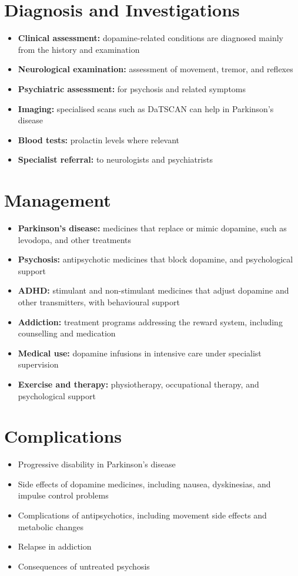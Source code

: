 \section*{Diagnosis and Investigations}
\begin{itemize}
    \item \textbf{Clinical assessment:} dopamine-related conditions are diagnosed mainly from the history and examination
    \item \textbf{Neurological examination:} assessment of movement, tremor, and reflexes
    \item \textbf{Psychiatric assessment:} for psychosis and related symptoms
    \item \textbf{Imaging:} specialised scans such as DaTSCAN can help in Parkinson's disease
    \item \textbf{Blood tests:} prolactin levels where relevant
    \item \textbf{Specialist referral:} to neurologists and psychiatrists
\end{itemize}

\section*{Management}
\begin{itemize}
    \item \textbf{Parkinson's disease:} medicines that replace or mimic dopamine, such as levodopa, and other treatments
    \item \textbf{Psychosis:} antipsychotic medicines that block dopamine, and psychological support
    \item \textbf{ADHD:} stimulant and non-stimulant medicines that adjust dopamine and other transmitters, with behavioural support
    \item \textbf{Addiction:} treatment programs addressing the reward system, including counselling and medication
    \item \textbf{Medical use:} dopamine infusions in intensive care under specialist supervision
    \item \textbf{Exercise and therapy:} physiotherapy, occupational therapy, and psychological support
\end{itemize}

\section*{Complications}
\begin{itemize}
    \item Progressive disability in Parkinson's disease
    \item Side effects of dopamine medicines, including nausea, dyskinesias, and impulse control problems
    \item Complications of antipsychotics, including movement side effects and metabolic changes
    \item Relapse in addiction
    \item Consequences of untreated psychosis
\end{itemize}

